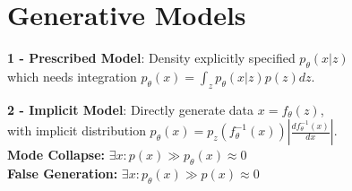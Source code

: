 \color{black}
\section*{Generative Models}
\textbf{1 - Prescribed Model}: Density explicitly specified $p_\theta(x|z)$\\
which needs integration \(p_\theta(x) = \int_z p_\theta(x|z) p(z) dz\).

\textbf{2 - Implicit Model}: Directly generate data $x = f_\theta(z)$,\\
with implicit distribution $p_\theta(x) = p_z(f_\theta^{-1}(x)) |\frac{df_\theta^{-1}(x)}{dx}|$.\\
\textbf{Mode Collapse:} $\exists x : p(x) \gg p_\theta(x) \approx 0$\\
\textbf{False Generation:} $\exists x : p_\theta(x) \gg p(x) \approx 0$\\